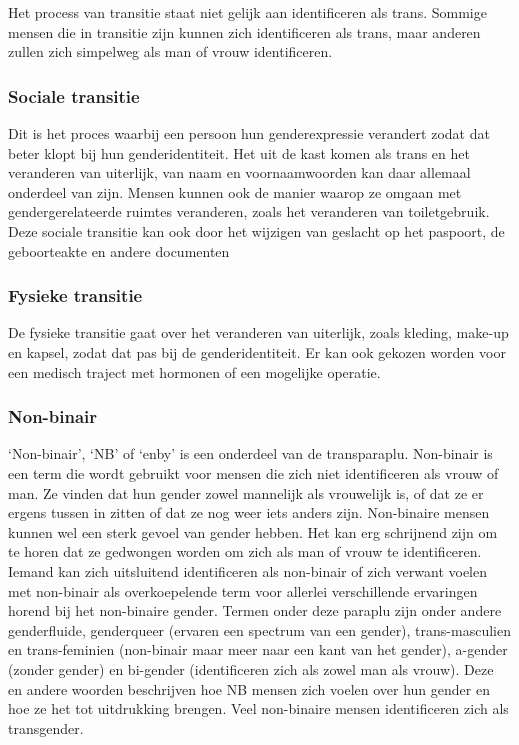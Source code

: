 \documentclass[12pt,openany]{book}
\begin{document}
Het process van transitie staat niet gelijk aan identificeren als trans. Sommige mensen die in transitie zijn kunnen zich identificeren als trans, maar anderen zullen zich simpelweg als man of vrouw identificeren.  

\subsubsection*{Sociale transitie}

Dit is het proces waarbij een persoon hun genderexpressie verandert zodat dat beter klopt bij hun genderidentiteit. Het uit de kast komen als trans en het veranderen van uiterlijk, van naam en voornaamwoorden kan daar allemaal onderdeel van zijn. Mensen kunnen ook de manier waarop ze omgaan met gendergerelateerde ruimtes veranderen, zoals het veranderen van toiletgebruik. Deze sociale transitie kan ook door het wijzigen van geslacht op het paspoort, de geboorteakte en andere documenten 

\subsubsection*{Fysieke transitie}

De fysieke transitie gaat over het veranderen van uiterlijk, zoals kleding, make-up en kapsel, zodat dat pas bij de genderidentiteit. Er kan ook gekozen worden voor een medisch traject met hormonen of een mogelijke operatie.  

\subsubsection*{Non-binair}

‘Non-binair’, ‘NB’ of ‘enby’ is een onderdeel van de transparaplu. Non-binair is een term die wordt gebruikt voor mensen die zich niet identificeren als vrouw of man. Ze vinden dat hun gender zowel mannelijk als vrouwelijk is, of dat ze er ergens tussen in zitten of dat ze nog weer iets anders zijn. Non-binaire mensen kunnen wel een sterk gevoel van gender hebben. Het kan erg schrijnend zijn om te horen dat ze gedwongen worden om zich als man of vrouw te identificeren. Iemand kan zich uitsluitend identificeren als non-binair of zich verwant voelen met non-binair als overkoepelende term voor allerlei verschillende ervaringen horend bij het non-binaire gender. Termen onder deze paraplu zijn onder andere genderfluide, genderqueer (ervaren een spectrum van een gender), trans-masculien en trans-feminien (non-binair maar meer naar een kant van het gender), a-gender (zonder gender) en bi-gender (identificeren zich als zowel man als vrouw). Deze en andere woorden beschrijven hoe NB mensen zich voelen over hun gender en hoe ze het tot uitdrukking brengen. 
Veel non-binaire mensen identificeren zich als transgender. 
\end{document}

